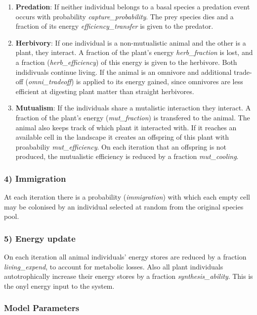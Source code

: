 \begin{enumerate}
	\item \textbf{Predation}: If neither individual belongs to a basal species a predation event occurs with probability \emph{capture\_probability}. The prey species dies and a fraction of its energy \emph{efficiency\_transfer} is given to the predator.
	\item \textbf{Herbivory}: If one individual is a non-mutualistic animal and the other is a plant, they interact. A fraction of the plant's energy \emph{herb\_fraction} is lost, and a fraction (\emph{herb\_efficiency}) of this energy is given to the herbivore. Both indidivuals continue living. If the animal is an omnivore and additional trade-off (\emph{omni\_tradeoff}) is applied to its energy gained, since omnivores are less efficient at digesting plant matter than straight herbivores.   
	\item \textbf{Mutualism}: If the individuals share a mutalistic interaction they interact. A fraction of the plant's energy (\emph{mut\_fraction}) is transfered to the animal. The animal also keeps track of which plant it interacted with. If it reaches an available cell in the landscape it creates an offspring of this plant with proababiliy \emph{mut\_efficiency}. On each iteration that an offspring is not produced, the mutualistic efficiency is reduced by a fraction \emph{mut\_cooling}.  
\end{enumerate}  
\subsubsection*{4) Immigration}
At each iteration there is a probability (\emph{immigration}) with which each empty cell may be colonised by an individual selected at random from the original species pool. 
\subsubsection*{5) Energy update}
On each iteration all animal individuals' energy stores are reduced by a fraction \emph{living\_expend}, to account for metabolic losses. Also all plant individuals autotrophically increase their energy stores by a fraction \emph{synthesis\_ability}. This is the onyl energy input to the system.

\subsubsection{Model Parameters}
\label{sec:parameters}

